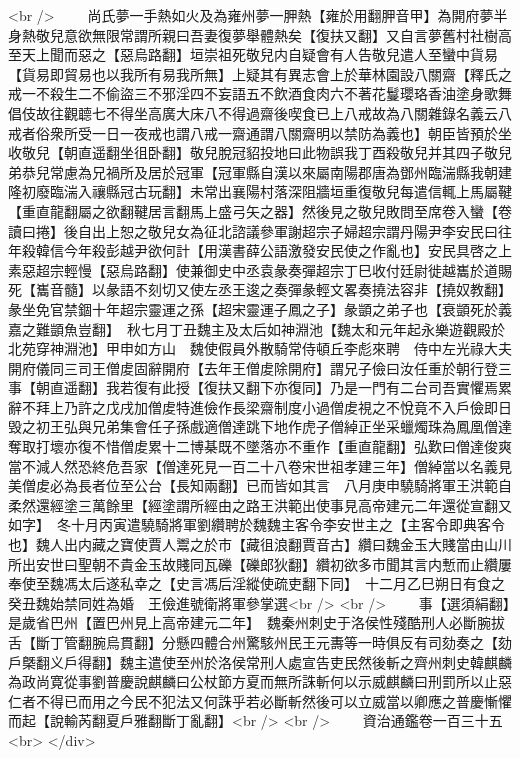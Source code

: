 <br />
　　尚氏夢一手熱如火及為雍州夢一胛熱【雍於用翻胛音甲】為開府夢半身熱敬兒意欲無限常謂所親曰吾妻復夢舉體熱矣【復扶又翻】又自言夢舊村社樹高至天上聞而惡之【惡烏路翻】垣崇祖死敬兒内自疑會有人告敬兒遣人至蠻中貨易【貨易即貿易也以我所有易我所無】上疑其有異志會上於華林園設八關齋【釋氏之戒一不殺生二不偷盜三不邪淫四不妄語五不飲酒食肉六不著花鬘瓔珞香油塗身歌舞倡伎故往觀聼七不得坐高廣大床八不得過齋後喫食已上八戒故為八關雜錄名義云八戒者俗衆所受一日一夜戒也謂八戒一齋通謂八關齋明以禁防為義也】朝臣皆預於坐收敬兒【朝直遥翻坐徂卧翻】敬兒脫冠貂投地曰此物誤我丁酉殺敬兒并其四子敬兒弟恭兒常慮為兄禍所及居於冠軍【冠軍縣自漢以來屬南陽郡唐為鄧州臨湍縣我朝建隆初廢臨湍入禳縣冠古玩翻】未常出襄陽村落深阻牆垣重復敬兒每遣信輒上馬屬鞬【重直龍翻屬之欲翻鞬居言翻馬上盛弓矢之器】然後見之敬兒敗問至席卷入蠻【卷讀曰捲】後自出上恕之敬兒女為征北諮議參軍謝超宗子婦超宗謂丹陽尹李安民曰往年殺韓信今年殺彭越尹欲何計【用漢書薛公語激發安民使之作亂也】安民具啓之上素惡超宗輕慢【惡烏路翻】使兼御史中丞袁彖奏彈超宗丁巳收付廷尉徙越巂於道賜死【巂音髓】以彖語不刻切又使左丞王逡之奏彈彖輕文畧奏撓法容非【撓奴教翻】彖坐免官禁錮十年超宗靈運之孫【超宋靈運子鳳之子】彖顗之弟子也【衰顗死於義嘉之難顗魚豈翻】　秋七月丁丑魏主及太后如神淵池【魏太和元年起永樂遊觀殿於北苑穿神淵池】甲申如方山　魏使假員外散騎常侍頓丘李彪來聘　侍中左光祿大夫開府儀同三司王僧䖍固辭開府【去年王僧䖍除開府】謂兄子儉曰汝任重於朝行登三事【朝直遥翻】我若復有此授【復扶又翻下亦復同】乃是一門有二台司吾實懼焉累辭不拜上乃許之戊戌加僧䖍特進儉作長梁齋制度小過僧䖍視之不悅竟不入戶儉即日毁之初王弘與兄弟集會任子孫戲適僧達跳下地作虎子僧綽正坐采蠟燭珠為鳳凰僧達奪取打壞亦復不惜僧䖍累十二博棊既不墜落亦不重作【重直龍翻】弘歎曰僧達俊爽當不減人然恐終危吾家【僧達死見一百二十八卷宋世祖孝建三年】僧綽當以名義見美僧䖍必為長者位至公台【長知兩翻】已而皆如其言　八月庚申驍騎將軍王洪範自柔然還經塗三萬餘里【經塗謂所經由之路王洪範出使事見高帝建元二年還從宣翻又如字】　冬十月丙寅遣驍騎將軍劉纘聘於魏魏主客令李安世主之【主客令即典客令也】魏人出内藏之寶使賈人鬻之於市【藏徂浪翻賈音古】纘曰魏金玉大賤當由山川所出安世曰聖朝不貴金玉故賤同瓦礫【礫郎狄翻】纘初欲多市聞其言内慙而止纘屢奉使至魏馮太后遂私幸之【史言馮后淫縱使疏吏翻下同】　十二月乙巳朔日有食之癸丑魏始禁同姓為婚　王儉進號衛將軍參掌選<br />
<br />
　　事【選須絹翻】　是歲省巴州【置巴州見上高帝建元二年】　魏秦州刺史于洛侯性殘酷刑人必斷腕拔舌【斷丁管翻腕烏貫翻】分懸四體合州驚駭州民王元夀等一時俱反有司劾奏之【劾戶槩翻义戶得翻】魏主遣使至州於洛侯常刑人處宣告吏民然後斬之齊州刺史韓麒麟為政尚寛從事劉普慶說麒麟曰公杖節方夏而無所誅斬何以示威麒麟曰刑罰所以止惡仁者不得已而用之今民不犯法又何誅乎若必斷斬然後可以立威當以卿應之普慶慚懼而起【說輸芮翻夏戶雅翻斷丁亂翻】<br />
<br />
　　資治通鑑卷一百三十五  <br>
   </div> 

